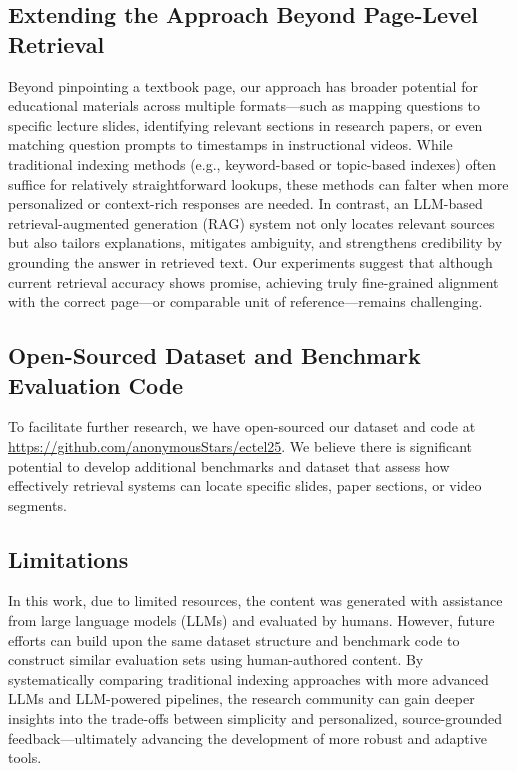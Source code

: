 \documentclass[runningheads]{llncs}
\begin{document}
\subsection{Extending the Approach Beyond Page-Level Retrieval}
Beyond pinpointing a textbook page, our approach has broader potential for educational materials across multiple formats—such as mapping questions to specific lecture slides, identifying relevant sections in research papers, or even matching question prompts to timestamps in instructional videos. While traditional indexing methods (e.g., keyword-based or topic-based indexes) often suffice for relatively straightforward lookups, these methods can falter when more personalized or context-rich responses are needed. In contrast, an LLM-based retrieval-augmented generation (RAG) system not only locates relevant sources but also tailors explanations, mitigates ambiguity, and strengthens credibility by grounding the answer in retrieved text. Our experiments suggest that although current retrieval accuracy shows promise, achieving truly fine-grained alignment with the correct page—or comparable unit of reference—remains challenging. 


\subsection{Open-Sourced Dataset and Benchmark Evaluation Code}

To facilitate further research, we have open-sourced our dataset and code at \url{https://github.com/anonymousStars/ectel25}. We believe there is significant potential to develop additional benchmarks and dataset that assess how effectively retrieval systems can locate specific slides, paper sections, or video segments.



\subsection{Limitations}
In this work, due to limited resources, the content was generated with assistance from large language models (LLMs) and evaluated by humans. However, future efforts can build upon the same dataset structure and benchmark code to construct similar evaluation sets using human-authored content. By systematically comparing traditional indexing approaches with more advanced LLMs and LLM-powered pipelines, the research community can gain deeper insights into the trade-offs between simplicity and personalized, source-grounded feedback—ultimately advancing the development of more robust and adaptive tools.
\end{document}
